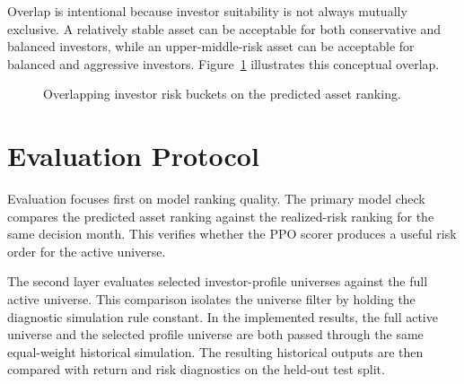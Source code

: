 Overlap is intentional because investor suitability is not always mutually exclusive. A relatively stable asset can be acceptable for both conservative and balanced investors, while an upper-middle-risk asset can be acceptable for balanced and aggressive investors. Figure~\ref{fig:bucket_mapping} illustrates this conceptual overlap.

\begin{figure}[H]
\centering
{}
\caption{Overlapping investor risk buckets on the predicted asset ranking.}
\label{fig:bucket_mapping}
\end{figure}

\section{Evaluation Protocol}
\label{sec:evaluation_protocol}

Evaluation focuses first on model ranking quality. The primary model check compares the predicted asset ranking against the realized-risk ranking for the same decision month. This verifies whether the PPO scorer produces a useful risk order for the active universe.

The second layer evaluates selected investor-profile universes against the full active universe. This comparison isolates the universe filter by holding the diagnostic simulation rule constant. In the implemented results, the full active universe and the selected profile universe are both passed through the same equal-weight historical simulation. The resulting historical outputs are then compared with return and risk diagnostics on the held-out test split.

